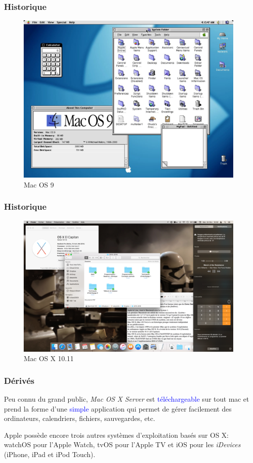\documentclass[aspectratio=169]{beamer}
\begin{document}
\begin{frame}
  \frametitle{Historique}
  \begin{figure}[!h]
    \center
    \includegraphics[scale=0.35]
    {textures/images/mac/historic/macos9.png}
    \caption{Mac OS 9}
  \end{figure}
\end{frame}

\begin{frame}
  \frametitle{Historique}
  \begin{figure}[!h]
    \center
    \includegraphics[scale=0.18]
    {textures/images/mac/historic/macosx11.png}
    \caption{Mac OS X 10.11}
  \end{figure}
\end{frame}

\begin{frame}
  \frametitle{Dérivés}
  Peu connu du grand public, \textit{Mac OS X Server} est
  \textcolor{blue}{téléchargeable} sur tout mac et prend la forme d’une
  \textcolor{blue}{simple} application qui permet de gérer facilement des
  ordinateurs, calendriers, fichiers, sauvegardes, etc.

  \hspace{0.5cm}

  Apple possède encore trois autres systèmes d’exploitation basés sur OS X:
  \\ watchOS pour l’Apple Watch, tvOS pour l’Apple TV  et iOS pour les
  \textit{iDevices} (iPhone, iPad et iPod Touch).
\end{frame}
\end{document}
